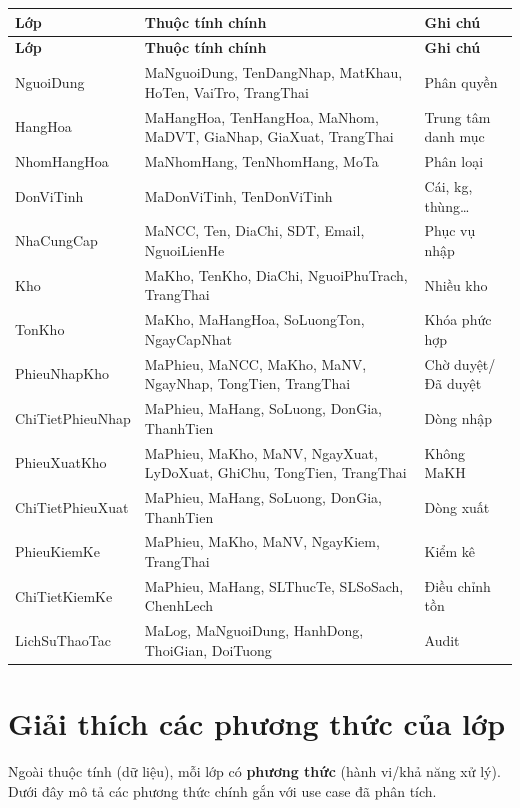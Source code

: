 \begin{longtable}{|p{3cm}|p{5.5cm}|p{4.5cm}|}
\hline
\textbf{Lớp} & \textbf{Thuộc tính chính} & \textbf{Ghi chú} \\
\hline
\endfirsthead
\hline
\textbf{Lớp} & \textbf{Thuộc tính chính} & \textbf{Ghi chú} \\
\hline
\endhead
NguoiDung & MaNguoiDung, TenDangNhap, MatKhau, HoTen, VaiTro, TrangThai & Phân quyền \\
\hline
HangHoa & MaHangHoa, TenHangHoa, MaNhom, MaDVT, GiaNhap, GiaXuat, TrangThai & Trung tâm danh mục \\
\hline
NhomHangHoa & MaNhomHang, TenNhomHang, MoTa & Phân loại \\
\hline
DonViTinh & MaDonViTinh, TenDonViTinh & Cái, kg, thùng\ldots \\
\hline
NhaCungCap & MaNCC, Ten, DiaChi, SDT, Email, NguoiLienHe & Phục vụ nhập \\
\hline
Kho & MaKho, TenKho, DiaChi, NguoiPhuTrach, TrangThai & Nhiều kho \\
\hline
TonKho & MaKho, MaHangHoa, SoLuongTon, NgayCapNhat & Khóa phức hợp \\
\hline
PhieuNhapKho & MaPhieu, MaNCC, MaKho, MaNV, NgayNhap, TongTien, TrangThai & Chờ duyệt/Đã duyệt \\
\hline
ChiTietPhieuNhap & MaPhieu, MaHang, SoLuong, DonGia, ThanhTien & Dòng nhập \\
\hline
PhieuXuatKho & MaPhieu, MaKho, MaNV, NgayXuat, LyDoXuat, GhiChu, TongTien, TrangThai & Không MaKH \\
\hline
ChiTietPhieuXuat & MaPhieu, MaHang, SoLuong, DonGia, ThanhTien & Dòng xuất \\
\hline
PhieuKiemKe & MaPhieu, MaKho, MaNV, NgayKiem, TrangThai & Kiểm kê \\
\hline
ChiTietKiemKe & MaPhieu, MaHang, SLThucTe, SLSoSach, ChenhLech & Điều chỉnh tồn \\
\hline
LichSuThaoTac & MaLog, MaNguoiDung, HanhDong, ThoiGian, DoiTuong & Audit \\
\hline
\end{longtable}

\section{Giải thích các phương thức của lớp}

Ngoài thuộc tính (dữ liệu), mỗi lớp có \textbf{phương thức} (hành vi/khả năng xử lý). Dưới đây mô tả các phương thức chính gắn với use case đã phân tích.


